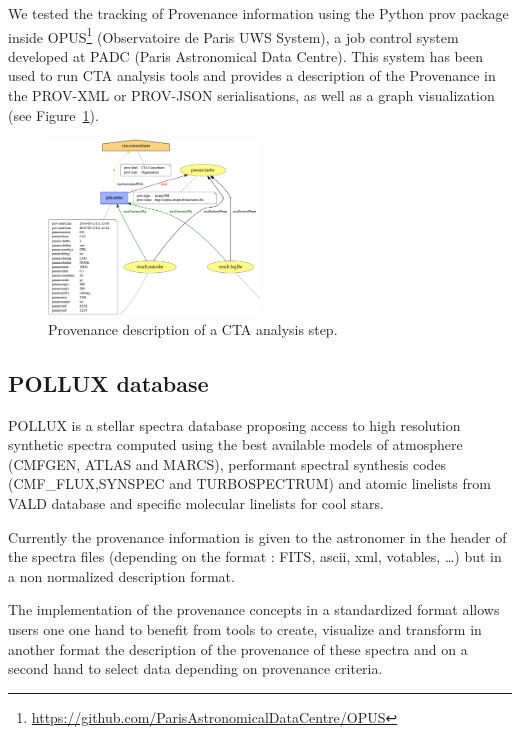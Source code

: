 We tested the tracking of Provenance information using the Python prov package inside OPUS\footnote{\url{https://github.com/ParisAstronomicalDataCentre/OPUS}} (Observatoire de Paris UWS System), a job control system developed at PADC (Paris Astronomical Data Centre). This system has been used to run CTA analysis tools and provides a description of the Provenance in the PROV-XML or PROV-JSON serialisations, as well as a graph visualization (see Figure~\ref{fig:cta_prov}).

\begin{figure}
\centering
\includegraphics[width=0.5\textwidth]{CTA_prov.png}
\caption{Provenance description of a CTA analysis step.}
\label{fig:cta_prov}
\end{figure}


\subsection{POLLUX database}

POLLUX is a stellar spectra database proposing access to high resolution synthetic spectra computed using the best available models of atmosphere (CMFGEN, ATLAS and MARCS), performant spectral synthesis codes (CMF\_FLUX,SYNSPEC and TURBOSPECTRUM) and atomic linelists from VALD database and specific molecular linelists for cool stars. 

Currently the provenance information is given to the astronomer in the header of the spectra files (depending on the format : FITS, ascii, xml, votables, …) but in a non normalized description format. 

The implementation of the provenance concepts in a standardized format allows users one one hand to benefit from tools to create, visualize and transform in another format the description of the provenance of these spectra and on a second hand to select data depending on provenance criteria.

